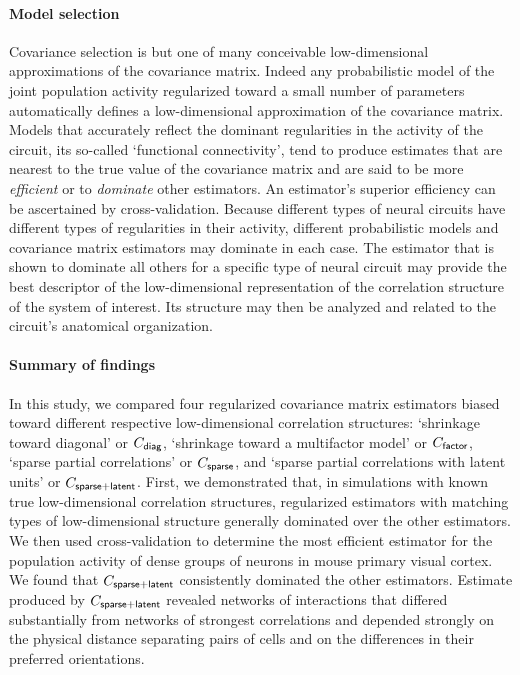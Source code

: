\documentclass[10pt]{article}
\begin{document}
\paragraph{Model selection}
Covariance selection is but one of many conceivable low-dimensional approximations of the covariance matrix. Indeed any probabilistic model of the joint population activity regularized toward a small number of parameters automatically defines a low-dimensional approximation of the covariance matrix. Models that accurately reflect the dominant regularities in the activity of the circuit, its so-called `functional connectivity', tend to produce estimates that are nearest to the true value of the covariance matrix and are said to be more \emph{efficient} or to \emph{dominate} other estimators. An estimator's superior efficiency can be ascertained by cross-validation.  Because different types of neural circuits have different types of regularities in their activity, different probabilistic models and covariance matrix estimators may dominate in each case. The estimator that is shown to dominate all others for a specific type of neural circuit may provide the best descriptor of the low-dimensional representation of the correlation structure of the system of interest. Its structure may then be analyzed and related to the circuit's anatomical organization.  

\paragraph{Summary of findings}
In this study, we compared four regularized covariance matrix estimators biased toward different respective low-dimensional correlation structures: `shrinkage toward diagonal' or $C_{\sf diag}$, `shrinkage toward a multifactor model' or $C_{\sf factor}$, `sparse partial correlations' or $C_{\sf sparse}$, and `sparse partial correlations with latent units' or $C_{\sf sparse+latent}$.  First, we demonstrated that, in simulations with known true low-dimensional correlation structures, regularized estimators with matching types of low-dimensional structure generally dominated over the other estimators. We then used cross-validation to determine the most efficient estimator for the population activity of dense groups of neurons in mouse primary visual cortex. We found that $C_{\sf sparse+latent}$ consistently dominated the other estimators.  Estimate produced by $C_{\sf sparse+latent}$ revealed networks of interactions that differed substantially from networks of strongest correlations and depended strongly on the physical distance separating pairs of cells and on the differences in their preferred orientations. 
\end{document}
